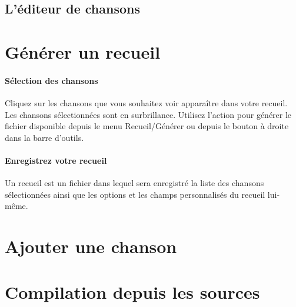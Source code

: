 \subsection{L'éditeur de chansons}


\section{Générer un recueil}

\paragraph{Sélection des chansons}
Cliquez sur les chansons que vous souhaitez voir apparaître dans votre
recueil. Les chansons sélectionnées sont en surbrillance. Utilisez
l'action  pour générer le fichier  disponible depuis le
menu Recueil/Générer ou depuis le bouton à droite dans la barre
d'outils.

\paragraph{Enregistrez votre recueil}
Un recueil est un fichier  dans lequel sera enregistré la liste des
chansons sélectionnées ainsi que les options et les champs
personnalisés du recueil lui-même.



\section{Ajouter une chanson}



\section{Compilation depuis les sources}

